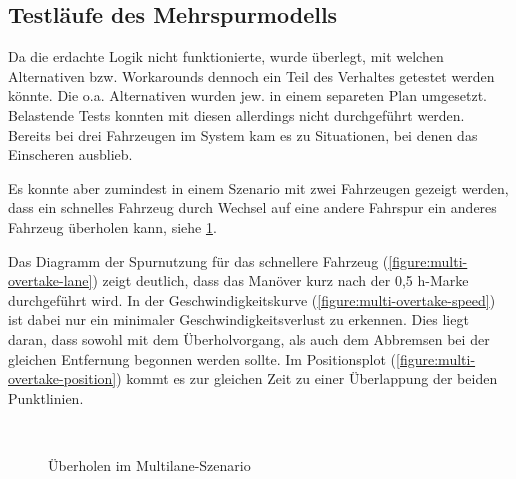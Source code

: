 


\subsection{Testläufe des Mehrspurmodells}
\label{test-multilane}

Da die erdachte Logik nicht funktionierte, wurde überlegt, mit welchen Alternativen bzw. Workarounds dennoch ein Teil des Verhaltes getestet werden könnte.
Die o.a. Alternativen wurden jew. in einem separeten Plan umgesetzt.
Belastende Tests konnten mit diesen allerdings nicht durchgeführt werden.
\\
Bereits bei drei Fahrzeugen im System kam es zu Situationen, bei denen das Einscheren ausblieb.

Es konnte aber zumindest in einem Szenario mit zwei Fahrzeugen gezeigt werden, dass ein schnelles Fahrzeug durch Wechsel auf eine andere Fahrspur ein anderes Fahrzeug überholen kann, siehe \cref{figure:multi-overtake}.

Das Diagramm der Spurnutzung für das schnellere Fahrzeug (\cref{figure:multi-overtake-lane}) zeigt deutlich, dass das Manöver kurz nach der 0,5 h-Marke durchgeführt wird. 
In der  Geschwindigkeitskurve (\cref{figure:multi-overtake-speed}) ist dabei nur ein minimaler Geschwindigkeitsverlust zu erkennen.
Dies liegt daran, dass sowohl mit dem Überholvorgang, als auch dem Abbremsen bei der gleichen Entfernung begonnen werden sollte.
Im Positionsplot (\cref{figure:multi-overtake-position}) kommt es zur gleichen Zeit zu einer Überlappung der beiden Punktlinien.

\begin{figure}[hptb]
  \centering 
   \qquad 
    \\ 
  \caption{Überholen im Multilane-Szenario} 
  \label{figure:multi-overtake}
\end{figure}



